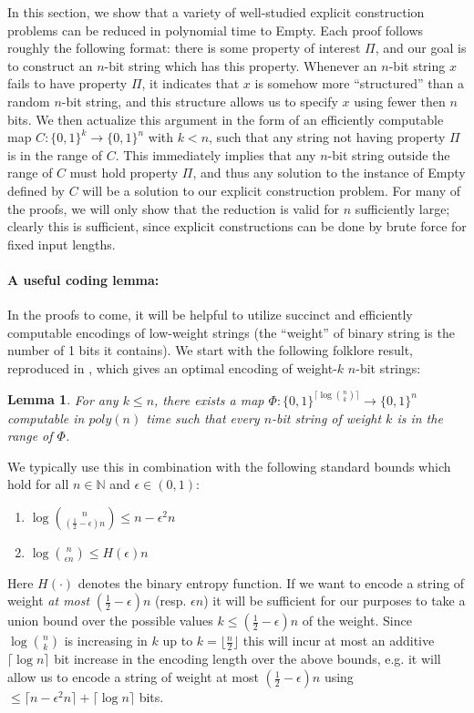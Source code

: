 \documentclass[11pt]{article}
\newtheorem{lemma}{Lemma}
\begin{document}
In this section, we show that a variety of well-studied explicit construction problems can be reduced in polynomial time to {\sc Empty}. Each proof follows roughly the following format: there is some property of interest $\Pi$, and our goal is to construct an $n$-bit string which has this property. Whenever an $n$-bit string $x$ fails to have property $\Pi$, it indicates that $x$ is somehow more ``structured'' than a random $n$-bit string, and this structure allows us to specify $x$ using fewer then $n$ bits. We then actualize this argument in the form of an efficiently computable map $C: \{0,1\}^k \rightarrow \{0,1\}^n$ with $k < n$, such that any string not having property $\Pi$ is in the range of $C$. This immediately implies that any $n$-bit string outside the range of $C$ must hold property $\Pi$, and thus any solution to the instance of {\sc Empty} defined by $C$ will be a solution to our explicit construction problem. For many of the proofs, we will only show that the reduction is valid for $n$ sufficiently large; clearly this is sufficient, since explicit constructions can be done by brute force for fixed input lengths.

\paragraph{A useful coding lemma:} In the proofs to come, it will be helpful to utilize succinct and efficiently computable encodings of low-weight strings (the ``weight'' of binary string is the number of 1 bits it contains). We start with the following folklore result, reproduced in \cite{Coin-Problem}, which gives an optimal encoding of weight-$k$ $n$-bit strings:

\begin{lemma}\label{lem:sparse-enc}\cite{Coin-Problem}
For any $k \leq n$, there exists a map $\Phi: \{0,1\}^{\lceil \log\binom{n}{k}\rceil } \rightarrow \{0,1\}^n$ computable in $poly(n)$ time such that every $n$-bit string of weight $k$ is in the range of $\Phi$.
\end{lemma}

We typically use this in combination with the following standard bounds which hold for all $n \in \mathbb{N}$ and $\epsilon \in (0,1)$:
\begin{enumerate}
    \item $\log\binom{n}{(\frac{1}{2}-\epsilon)n} \leq n - \epsilon^2n$
    \item $\log \binom{n}{\epsilon n} \leq H(\epsilon)n$
\end{enumerate}
Here $H(\cdot)$ denotes the binary entropy function. If we want to encode a string of weight \emph{at most} $(\frac{1}{2}-\epsilon)n$ (resp. $\epsilon n$) it will be sufficient for our purposes to take a union bound over the possible values $k \leq (\frac{1}{2}-\epsilon)n$ of the weight. Since $\log\binom{n}{k}$ is increasing in $k$ up to $k = \lfloor \frac{n}{2} \rfloor$ this will incur at most an additive $\lceil \log n \rceil$ bit increase in the encoding length over the above bounds, e.g. it will allow us to encode a string of weight at most $(\frac{1}{2}-\epsilon)n$ using $\leq \lceil n - \epsilon^2n \rceil + \lceil \log n \rceil$ bits.
\end{document}
